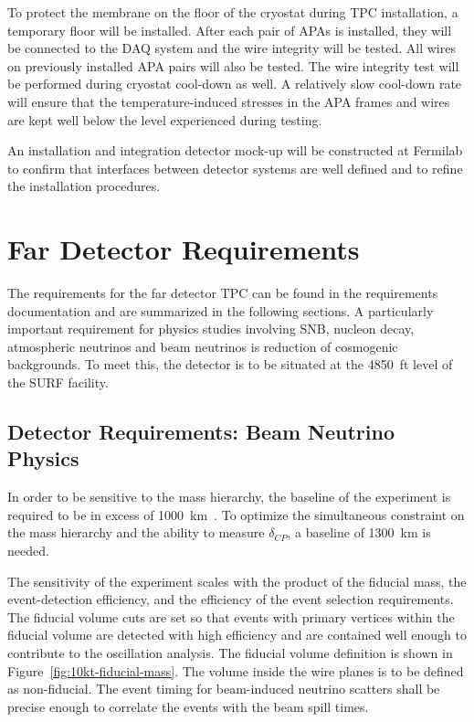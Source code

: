 To protect the membrane on the floor of the cryostat during TPC installation, a temporary floor will be installed. After each pair of APAs is installed, they will be connected to the DAQ system and the wire integrity will be tested. All wires on previously installed APA pairs will also be tested. The wire integrity test will be performed during cryostat cool-down as well. A relatively slow cool-down rate will ensure that the temperature-induced stresses in the APA frames and wires are kept well below the level experienced during testing. 

An installation and integration detector mock-up will be constructed at Fermilab to confirm that interfaces between detector systems are well defined and to refine the installation procedures. 



\section{Far Detector Requirements}

The requirements for the far detector TPC can be found in the requirements documentation \cite{lar-fd-req} and are summarized in the following sections.  A particularly important requirement for physics studies involving SNB, nucleon decay,
atmospheric neutrinos and beam neutrinos is reduction of cosmogenic backgrounds. To meet this, 
 the detector is to be situated at the 4850~ft level of the SURF facility. 


\subsection{Detector Requirements: Beam Neutrino Physics}

In order to be sensitive to the mass hierarchy, the baseline of the
experiment is required to be in excess of
1000~km~\cite{bib:sci-opp-doc, Bass:2013vcg}.  To optimize the simultaneous
constraint on the mass hierarchy and the ability to measure
$\delta_{CP}$, a baseline of 1300~km is needed.

The sensitivity of the experiment scales with the product of the
fiducial mass, the event-detection efficiency, and the efficiency of
the event selection requirements.  The fiducial volume cuts are set so
that events with primary vertices within the fiducial volume are
detected with high efficiency and are contained well enough to
contribute to the oscillation analysis.  The fiducial volume definition
is shown in Figure~\ref{fig:10kt-fiducial-mass}.  The
volume inside the wire planes is to be defined as non-fiducial.
The event timing for beam-induced neutrino scatters
shall be precise enough to correlate the events with the
beam spill times.  

